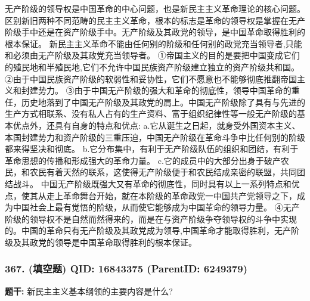 \documentclass[12pt,UTF8]{ctexart}
\begin{document}
无产阶级的领导权是中国革命的中心问题，也是新民主主义革命理论的核心问题。区别新旧两种不同范畴的民主主义革命，根本的标志是革命的领导权是掌握在无产阶级手中还是在资产阶级手中。无产阶级及其政党的领导，是中国革命取得胜利的根本保证。
新民主主义革命不能由任何别的阶级和任何别的政党充当领导者,只能和必须由无产阶级及其政党充当领导者。
①帝国主义的目的是要把中国变成它们的殖民地和半殖民地,它们不允许中国民族资产阶级建立独立的资产阶级共和国。
②由于中国民族资产阶级的软弱性和妥协性，它们不愿意也不能够彻底推翻帝国主义和封建势力。
③由于中国无产阶级的强大和革命的彻底性，领导中国革命的重任，历史地落到了中国无产阶级及其政党的肩上。中国无产阶级除了具有与先进的生产方式相联系、没有私人占有的生产资料、富于组织纪律性等一般无产阶级的基本优点外，还具有自身的特点和优点:
a.它从诞生之日起，就身受外国资本主义、本国封建势力和资产阶级的三重压迫，中国无产阶级在革命斗争中比任何别的阶级都来得坚决和彻底。
b.它分布集中，有利于无产阶级队伍的组织和团结，有利于革命思想的传播和形成强大的革命力量。
c.它的成员中的大部分出身于破产农民，和农民有着天然的联系，这使得无产阶级便于和农民结成亲密的联盟，共同团结战斗。
中国无产阶级既强大又有革命的彻底性，同时具有以上一系列特点和优点，使其从走上革命舞台开始，就在本阶级的革命政党一中国共产党领导之下，成为中国社会上最有觉悟的阶级，从而使它能够成为中国革命的领导力量。
④无产阶级的领导权不是自然而然得来的，而是在与资产阶级争夺领导权的斗争中实现的。中国的革命只有无产阶级及其政党成为领导,中国革命才能取得胜利，无产阶级及其政党的领导是中国革命取得胜利的根本保证。

\vspace{0.3em}\hrulefill\vspace{0.7em}

\subsubsection*{367. (填空题) \small QID: 16843375 (ParentID: 6249379)}

\textbf{题干:}
新民主主义基本纲领的主要内容是什么?
\end{document}
